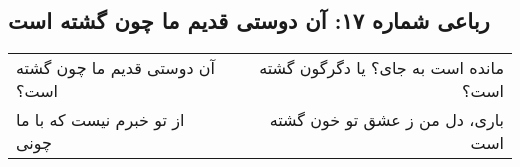 \begin{center}
\section*{رباعی شماره ۱۷: آن دوستی قدیم ما چون گشته است}
\label{sec:017}
\begin{longtable}{l p{0.5cm} r}
آن دوستی قدیم ما چون گشته است؟
&&
مانده است به جای؟ یا دگرگون گشته است؟
\\
از تو خبرم نیست که با ما چونی
&&
باری، دل من ز عشق تو خون گشته است
\\
\end{longtable}
\end{center}

